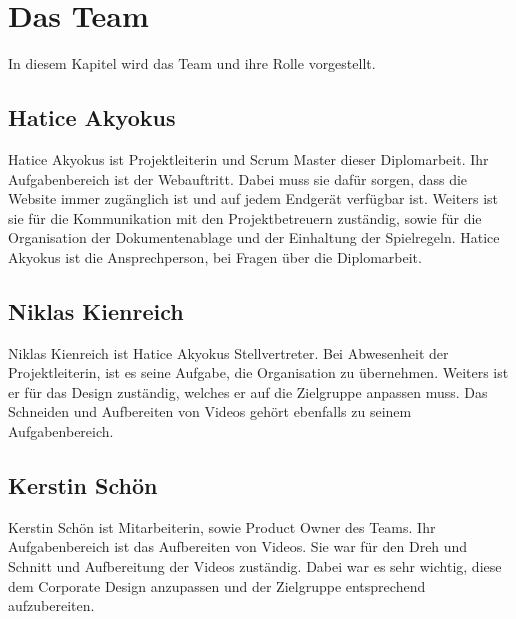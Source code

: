\chapter{Das Team}
In diesem Kapitel wird das Team und ihre Rolle vorgestellt. 

\section{Hatice Akyokus}
Hatice Akyokus ist Projektleiterin und Scrum Master dieser Diplomarbeit. Ihr Aufgabenbereich ist der Webauftritt. Dabei muss sie dafür sorgen, dass die Website immer zugänglich ist und auf jedem Endgerät verfügbar ist. Weiters ist sie für die Kommunikation mit den Projektbetreuern zuständig, sowie für die Organisation der Dokumentenablage und der Einhaltung der Spielregeln. Hatice Akyokus ist die Ansprechperson, bei Fragen über die Diplomarbeit. 
\section{Niklas Kienreich}
Niklas Kienreich ist Hatice Akyokus Stellvertreter. Bei Abwesenheit der Projektleiterin, ist es seine Aufgabe, die Organisation zu übernehmen. Weiters ist er für das Design zuständig, welches er auf die Zielgruppe anpassen muss. Das Schneiden und Aufbereiten von Videos gehört ebenfalls zu seinem Aufgabenbereich.
\section{Kerstin Schön}
Kerstin Schön ist Mitarbeiterin, sowie Product Owner des Teams. Ihr Aufgabenbereich ist das Aufbereiten von Videos. Sie war für den Dreh und Schnitt und Aufbereitung der Videos zuständig. Dabei war es sehr wichtig, diese dem Corporate Design anzupassen und der Zielgruppe entsprechend aufzubereiten. 